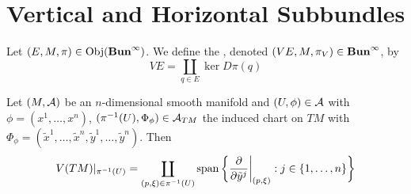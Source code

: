 \documentclass{book}
\begin{document}
	\begin{defn}
		
	\end{defn}
	
	
	
	
	
	
	
	
	
	
	
	
	
	
	
	
	
	
	
	
	
	
	
	
	
	
	
	
	
	
	
	
	
	
	
	
	
	
	
	
	
	
	\newpage
	\section{Vertical and Horizontal Subbundles}
	
	\begin{defn}
		Let $(E, M, \pi) \in \operatorname{Obj}(\operatorname*{\text{\textbf{Bun}}^{\infty}})$. We define the , denoted $(VE, M, \pi_{V}) \in \operatorname*{\text{\textbf{Bun}}^{\infty}}$, by 
		$$VE = \coprod_{q \in E} \ker D\pi(q)$$
	\end{defn}
	
	
	\begin{ex}
		Let $(M, \mathcal{A})$ be an $n$-dimensional smooth manifold and $(U, \phi) \in \mathcal{A}$ with $\phi = (x^1, \ldots, x^n)$,  $(\pi^{-1}(U), \Phi_{\phi}) \in \mathcal{A}_{TM}$ the induced chart on $TM$ with $\Phi_{\phi} = (\tilde{x}^1, \ldots, \tilde{x}^n,  \tilde{y}^1, \ldots, \tilde{y}^n)$. Then 
		$$V(TM)|_{\pi^{-1}(U)} = \coprod_{(p, \xi) \in \pi^{-1}(U)} \operatorname{span} \bigg \{ \frac{\partial}{\partial \tilde{y}^j} \bigg|_{(p, \xi)}: j \in \{1, \ldots, n\} \bigg \}$$
	\end{ex}
	
\end{document}
